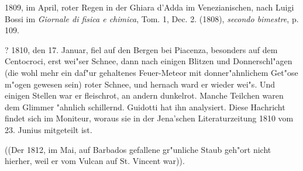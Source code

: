 \documentclass[a4paper, 11pt, oneside, polutonikogreek, german]{article}
\begin{document}
1809, im April, roter Regen in der Ghiara d'Adda im Venezianischen, nach Luigi Bossi im \emph{Giornale di fisica e chimica}, Tom. 1, Dec. 2. (1808), \emph{secondo bimestre}, p. 109.

? 1810, den 17. Januar, fiel auf den Bergen bei Piacenza, besonders auf dem Centocroci, erst wei"ser Schnee, dann nach einigen Blitzen und Donnerschl"agen (die wohl mehr ein daf"ur gehaltenes Feuer-Meteor mit donner"ahnlichem Get"ose m"ogen gewesen sein) roter Schnee, und hernach ward er wieder wei"s. Und einigen Stellen war er fleischrot, an andern dunkelrot. Manche Teilchen waren dem Glimmer "ahnlich schillernd. Guidotti hat ihn analysiert. Diese Hachricht findet sich im Moniteur, woraus sie in der Jena'schen Literaturzeitung 1810 vom 23. Junius mitgeteilt ist.

((Der 1812, im Mai, auf Barbados gefallene gr"unliche Staub geh"ort nicht hierher, weil er vom Vulcan auf St. Vincent war)).
\end{document}
